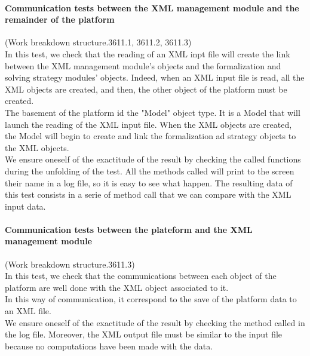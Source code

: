 \paragraph{Communication tests between the XML management module and the remainder of the platform}
(Work breakdown structure.3611.1, 3611.2, 3611.3)\\
In this test, we check that the reading of an XML inpt file will create the link between the XML management module's objects and the
formalization and solving strategy modules' objects. Indeed, when an XML input file is read, all the XML objects are created, and then,
the other object of the platform must be created.\\
The basement of the platform id the "Model" object type. It is a Model that will launch the reading of the XML input file. When the XML
objects are created, the Model will begin to create and link the formalization ad strategy objects to the XML objects.\\
We ensure oneself of the exactitude of the result by checking the called functions during the unfolding of the test. All the methods
called will print to the screen their name in a log file, so it is easy to see what happen. The resulting data of this test consists in a serie of
method call that we can compare with the XML input data.

\paragraph{Communication tests between the plateform and the XML management module}
(Work breakdown structure.3611.3)\\
In this test, we check that the communications between each object of the platform are well done with the XML object associated to it.\\
In this way of communication, it correspond to the save of the platform data to an XML file.\\
We ensure oneself of the exactitude of the result by checking the method called in the log file. Moreover, the XML output file must be
similar to the input file because no computations have been made with the data.

